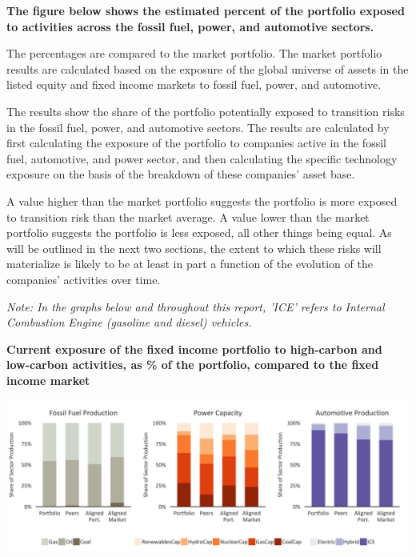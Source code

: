 \documentclass[10pt,table,a4]{article}\usepackage[]{graphicx}\usepackage[]{color}
\begin{document}
	\begin{multicols}{2}
		
		\textbf{The figure below shows the estimated percent of the portfolio exposed to activities across the fossil fuel, power, and automotive sectors.}
		
		The percentages are compared to the market portfolio. The market portfolio results are calculated based on the exposure of the global universe of assets in the listed equity and fixed income markets to fossil fuel, power, and automotive.
		
		The results show the share of the portfolio potentially exposed to transition risks in the fossil fuel, power, and automotive sectors. The results are calculated by first calculating the exposure of the portfolio to companies active in the fossil fuel, automotive, and power sector, and then calculating the specific technology exposure on the basis of the breakdown of these companies’ asset base. 
		
		A value higher than the market portfolio suggests the portfolio is more exposed to transition risk than the market average. A value lower than the market portfolio suggests the portfolio is less exposed, all other things being equal. As will be outlined in the next two sections, the extent to which these risks will materialize is likely to be at least in part a function of the evolution of the companies’ activities over time. 
		
		\textit{Note: In the graphs below and throughout this report, 'ICE' refers to Internal Combustion Engine (gasoline and diesel) vehicles.}
		
		
	\end{multicols}
	
	\textbf{Current exposure of the fixed income portfolio to high-carbon and low-carbon activities, as \% of the portfolio, compared to the fixed income market}	%
	
	\includegraphics[trim = {0 0cm 0 0cm},width=1\linewidth]{CAFigures/Fig05} %
	
\end{document}
